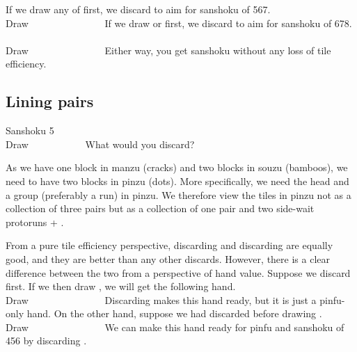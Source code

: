 \bigskip
\noindent If we draw any of {\LARGE{}} first, we discard {\LARGE{}} to aim for {\jap sanshoku} of 567. 
\bp
{}~\\
\hfill\footnotesize{Draw~~~~~~~~~~~~~~~}
\ep
If we draw {\LARGE{}} or {\LARGE{}} first, we discard {\LARGE{}} to aim for {\jap sanshoku} of 678. 
\bp
{}~\\
\hfill\footnotesize{Draw~~~~~~~~~~~~~~~}
\ep
Either way, you get {\jap sanshoku} without any loss of tile efficiency. 

\newpage
\subsection{Lining pairs}\label{sec:san5}
\begin{itembox}[r]{{\jap Sanshoku} 5}
\bp
{}~\\
\hfill\footnotesize{Draw~~~~~~~~~~~}
\ep
\vspace{-17pt}What would you discard? \vspace{-5pt}
\end{itembox}
\noindent
As we have one block in {\jap manzu} (cracks) and two blocks in {\jap souzu} (bamboos), we need to have two blocks in {\jap pinzu} (dots). More specifically, we need the head and a group (preferably a run) in {\jap pinzu}. 
We therefore view the tiles in {\jap pinzu} not as a collection of three pairs but as a collection of one pair {\LARGE{}} and two side-wait protoruns {\LARGE{}} + {\LARGE{}}. 

\bigskip
From a pure tile efficiency perspective, discarding {\LARGE{}} and discarding {\LARGE{}} are equally good, and they are better than any other discards. However, there is a clear difference between the two from a perspective of hand value. 
Suppose we discard {\LARGE{}} first. If we then draw {\LARGE{}}, we will get the following hand.
\bp
{}~\\
\hfill\footnotesize{Draw~~~~~~~~~~~~~~~}
\ep
Discarding {\LARGE{}} makes this hand ready, but it is just a {\jap pinfu}-only hand. On the other hand, suppose we had discarded {\LARGE{}} before drawing {\LARGE{}}. 
\bp
{}~\\
\hfill\footnotesize{Draw~~~~~~~~~~~~~~~}
\ep
We can make this hand ready for {\jap pinfu} and {\jap sanshoku} of 456 by discarding {\LARGE{}}. 

